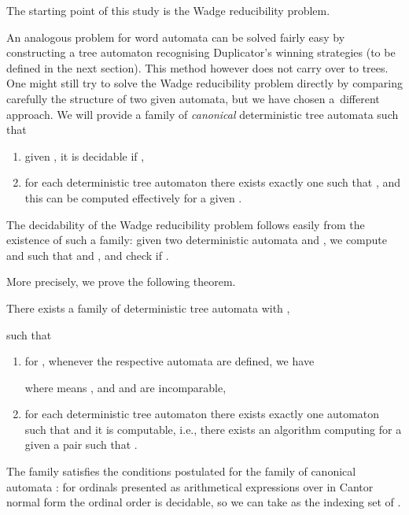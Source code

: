 \documentclass{LMCS}
\begin{document}
The starting point of this study is the  Wadge reducibility problem. 

\begin{center}
\end{center}

\noindent An analogous problem for word automata can be solved fairly
easy by constructing a tree automaton
recognising Duplicator's winning strategies (to be defined in the next
section). This method however
does not carry over to trees. One might still try
to solve the Wadge reducibility problem directly by comparing carefully the
structure of two given automata, but we have chosen a~different
approach. We will provide a family of {\em canonical} deterministic
tree automata  such that 
\begin{enumerate}[(1)]
\item given , it is decidable if ,
\item for each deterministic tree automaton there exists exactly
  one  such that , and this  can be
  computed effectively for a given .
\end{enumerate}
\noindent The decidability of the Wadge reducibility problem follows
easily from the existence of such a family: given two
deterministic automata  and , we compute  and  such that
 and , and check if
. 

More precisely, we prove the following theorem. 
\begin{thm} \label{main}
There exists a family of deterministic tree automata  with ,

such that  
\begin{enumerate}[\em(1)]
\item for , whenever
  the respective automata are defined, we have 

where  means , and  and
 are incomparable,

\item for each deterministic tree automaton  there exists exactly
  one automaton  such that 
  and it is computable, i.e., there exists an algorithm
  computing for a given  a pair   such that . 
\end{enumerate}
\end{thm}
\noindent The family  satisfies the conditions
postulated for the family of canonical automata : for ordinals presented as
arithmetical expressions over  in
Cantor normal form the ordinal order is decidable, so we can take   as the indexing set of . 
\end{document}
